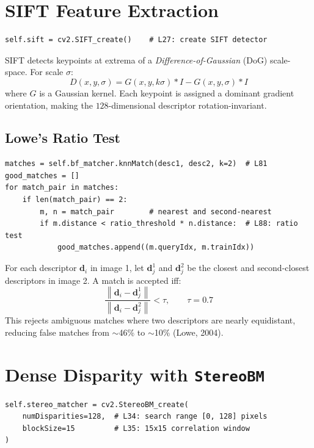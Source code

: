 \documentclass[12pt,a4paper,twoside]{report}
\theoremstyle{definition}
\newcommand{\vect}[1]{\bm{#1}}
\newcommand{\norm}[1]{\left\lVert #1 \right\rVert}
\begin{document}
\section{SIFT Feature Extraction}

\begin{lstlisting}
self.sift = cv2.SIFT_create()    # L27: create SIFT detector
\end{lstlisting}

\begin{defbox}
SIFT detects keypoints at extrema of a \emph{Difference-of-Gaussian} (DoG)
scale-space. For scale $\sigma$:
\[
  D(x,y,\sigma) = G(x,y,k\sigma)*I - G(x,y,\sigma)*I
\]
where $G$ is a Gaussian kernel. Each keypoint is assigned a dominant gradient
orientation, making the $128$-dimensional descriptor rotation-invariant.
\end{defbox}

\subsection{Lowe's Ratio Test}

\begin{lstlisting}
matches = self.bf_matcher.knnMatch(desc1, desc2, k=2)  # L81
good_matches = []
for match_pair in matches:
    if len(match_pair) == 2:
        m, n = match_pair        # nearest and second-nearest
        if m.distance < ratio_threshold * n.distance:  # L88: ratio test
            good_matches.append((m.queryIdx, m.trainIdx))
\end{lstlisting}

\begin{mathbox}
For each descriptor $\vect{d}_i$ in image 1, let $\vect{d}^1_j$ and
$\vect{d}^2_j$ be the closest and second-closest descriptors in image 2.
A match is accepted iff:
\[
  \frac{\norm{\vect{d}_i - \vect{d}^1_j}}{\norm{\vect{d}_i - \vect{d}^2_j}} < \tau, \qquad \tau = 0.7
\]
This rejects ambiguous matches where two descriptors are nearly equidistant,
reducing false matches from $\sim$46\% to $\sim$10\% (Lowe, 2004).
\end{mathbox}

\section{Dense Disparity with \texttt{StereoBM}}

\begin{lstlisting}
self.stereo_matcher = cv2.StereoBM_create(
    numDisparities=128,  # L34: search range [0, 128] pixels
    blockSize=15         # L35: 15x15 correlation window
)
\end{lstlisting}
\end{document}
